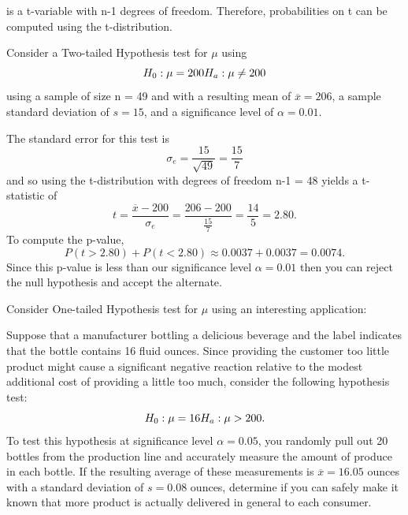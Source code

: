 \documentclass[10pt,]{book}
\numberwithin{equation}{section}
\newcommand{\lt}{<}
\newcommand{\gt}{>}
\begin{document}
is a t-variable with n-1 degrees of freedom. Therefore, probabilities on t can be computed using the t-distribution.%
\par
\hypertarget{p-1198}{}%
Consider a Two-tailed Hypothesis test for \(\mu\) using%
\begin{equation*}
H_0 : \mu = 200 \\ H_a: \mu \neq 200
\end{equation*}
using a sample of size n = 49 and with a resulting mean of \(\overline{x} = 206\), a sample standard deviation of \(s = 15\), and a significance level of \(\alpha = 0.01\).%
\par
\hypertarget{p-1199}{}%
The standard error for this test is%
\begin{equation*}
\sigma_e = \frac{15}{\sqrt{49}} = \frac{15}{7}
\end{equation*}
and so using the t-distribution with degrees of freedom n-1 = 48 yields a t-statistic of%
\begin{equation*}
t = \frac{\overline{x} - 200}{\sigma_e} = \frac{206-200}{\frac{15}{7}} = \frac{14}{5} = 2.80.
\end{equation*}
To compute the p-value,%
\begin{equation*}
P(t \gt 2.80) + P(t \lt 2.80) \approx 0.0037 + 0.0037 = 0.0074.
\end{equation*}
Since this p-value is less than our significance level \(\alpha = 0.01\) then you can reject the null hypothesis and accept the alternate.%
\par
\hypertarget{p-1200}{}%
Consider One-tailed Hypothesis test for \(\mu\) using an interesting application:%
\par
\hypertarget{p-1201}{}%
Suppose that a manufacturer bottling a delicious beverage and the label indicates that the bottle contains 16 fluid ounces. Since providing the customer too little product might cause a significant negative reaction relative to the modest additional cost of providing a little too much, consider the following hypothesis test:%
\begin{equation*}
H_0 : \mu = 16 \\ H_a: \mu \gt 200.
\end{equation*}
To test this hypothesis at significance level \(\alpha = 0.05\), you randomly pull out 20 bottles from the production line and accurately measure the amount of produce in each bottle. If the resulting average of these measurements is \(\overline{x} = 16.05\) ounces with a standard deviation of \(s = 0.08\) ounces, determine if you can safely make it known that more product is actually delivered in general to each consumer.%
\end{document}

